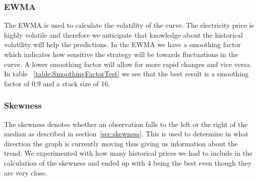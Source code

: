 \subsubsection{EWMA}
The EWMA is used to calculate the volatility of the curve. The electricity price is highly volatile and therefore we anticipate that knowledge about the historical volatility will help the predictions. In the EWMA we have a smoothing factor which indicates how sensitive the strategy will be towards fluctuations in the curve. A lower smoothing factor will allow for more rapid changes and vice versa. In table ~\ref{table:SmoothingFactorTest} we see that the best result is a smoothing factor of 0.9 and a stack size of 16.

\begin{table}[H]
\centering  %
\caption{Smoothing factor test} %
\label{table:SmoothingFactorTest} %
\end{table}

\subsubsection{Skewness}
The skewness denotes whether an observation falls to the left or the right of the median as described in section~\ref{sec:skewness}. This is used to determine in what direction the graph is currently moving thus giving us information about the trend. We experimented with how many historical prices we had to include in the calculation of the skewness and ended up with 4 being the best even though they are very close.

